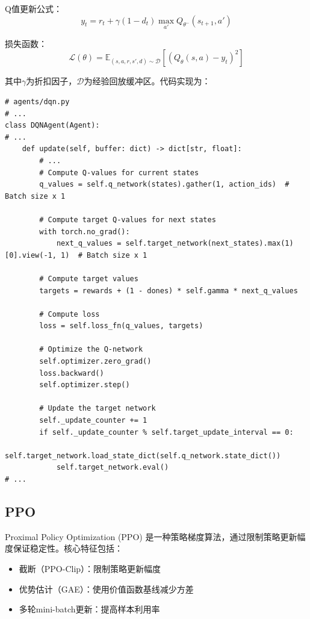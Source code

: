 \documentclass[12pt,a4paper]{article}
\begin{document}
Q值更新公式：
\begin{equation}
    \label{eq:dqn_target}
    y_t = r_t + \gamma (1 - d_t) \max_{a'} Q_{\theta^-}(s_{t+1}, a')
\end{equation}

损失函数：
\begin{equation}
    \label{eq:dqn_loss}
    \mathcal{L}(\theta) = \mathbb{E}_{(s,a,r,s',d)\sim\mathcal{D}} \left[ \left( Q_\theta(s,a) - y_t \right)^2 \right]
\end{equation}

其中$\gamma$为折扣因子，$\mathcal{D}$为经验回放缓冲区。代码实现为：
\begin{lstlisting}
# agents/dqn.py
# ...
class DQNAgent(Agent):
# ...
    def update(self, buffer: dict) -> dict[str, float]:
        # ...
        # Compute Q-values for current states
        q_values = self.q_network(states).gather(1, action_ids)  # Batch size x 1

        # Compute target Q-values for next states
        with torch.no_grad():
            next_q_values = self.target_network(next_states).max(1)[0].view(-1, 1)  # Batch size x 1

        # Compute target values
        targets = rewards + (1 - dones) * self.gamma * next_q_values

        # Compute loss
        loss = self.loss_fn(q_values, targets)

        # Optimize the Q-network
        self.optimizer.zero_grad()
        loss.backward()
        self.optimizer.step()

        # Update the target network
        self._update_counter += 1
        if self._update_counter % self.target_update_interval == 0:
            self.target_network.load_state_dict(self.q_network.state_dict())
            self.target_network.eval()
# ...
\end{lstlisting}

\subsection{PPO}
Proximal Policy Optimization (PPO) 是一种策略梯度算法，通过限制策略更新幅度保证稳定性。核心特征包括：

\begin{itemize}
    \item 截断（PPO-Clip）：限制策略更新幅度
    \item 优势估计（GAE）：使用价值函数基线减少方差
    \item 多轮mini-batch更新：提高样本利用率
\end{itemize}
\end{document}
